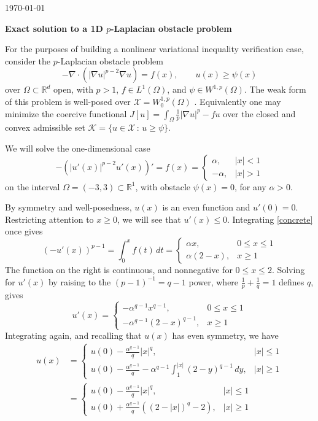 \documentclass[11pt]{amsart}
\newcommand{\Div}{\ensuremath{\nabla\cdot}}
\newcommand{\grad}{\nabla}
\newcommand{\RR}{\mathbb{R}}
\begin{document}
\scriptsize \hfill \today

\Large
\bigskip
\centerline{\textbf{Exact solution to a 1D $p$-Laplacian obstacle problem}}
\bigskip

\normalsize

\thispagestyle{empty}

For the purposes of building a nonlinear variational inequality verification case, consider the $p$-Laplacian obstacle problem
    $$-\Div(|\grad u|^{p-2} \grad u) = f(x), \qquad u(x) \ge \psi(x)$$
over $\Omega\subset \RR^d$ open, with $p>1$, $f \in L^1(\Omega)$, and $\psi \in W^{1,p}(\Omega)$.  The weak form of this problem is well-posed over $\mathcal{X} = W_0^{1,p}(\Omega)$ \cite{KinderlehrerStampacchia1980}.  Equivalently one may minimize the coercive functional $J[u] = \int_\Omega \frac{1}{p} |\grad u|^p - f u$ over the closed and convex admissible set $\mathcal{K}=\{u \in \mathcal{X}\,:\, u \ge \psi\}$.

We will solve the one-dimensional case
\begin{equation}
-\left(|u'(x)|^{p-2} u'(x)\right)' = f(x) = \begin{cases} \alpha, & |x| < 1 \\ -\alpha, & |x| > 1\end{cases} \label{concrete}
\end{equation}
on the interval $\Omega = (-3,3) \subset \RR^1$, with obstacle $\psi(x)=0$, for any $\alpha>0$.

By symmetry and well-posedness, $u(x)$ is an even function and $u'(0)=0$.  Restricting attention to $x\ge 0$, we will see that $u'(x)\le 0$.  Integrating \eqref{concrete} once gives
    $$\left(-u'(x)\right)^{p-1} = \int_0^x f(t)\,dt = \begin{cases} \alpha x, & 0 \le x \le 1 \\ \alpha (2 - x), & x \ge 1\end{cases}$$
The function on the right is continuous, and nonnegative for $0 \le x \le 2$.  Solving for $u'(x)$ by raising to the $(p-1)^{-1} = q-1$ power, where $\frac{1}{p} + \frac{1}{q} = 1$ defines $q$, gives
    $$u'(x) = \begin{cases} - \alpha^{q-1} x^{q-1}, & 0 \le x \le 1 \\ -\alpha^{q-1} (2 - x)^{q-1}, & x \ge 1\end{cases}$$
Integrating again, and recalling that $u(x)$ has even symmetry, we have
\begin{align*}
u(x) &= \begin{cases} u(0) - \frac{\alpha^{q-1}}{q} |x|^q, & |x| \le 1 \\
                      u(0) - \frac{\alpha^{q-1}}{q} -\alpha^{q-1} \int_1^{|x|} (2 - y)^{q-1}\,dy, & |x| \ge 1\end{cases} \\
     &= \begin{cases} u(0) - \frac{\alpha^{q-1}}{q} |x|^q, & |x| \le 1 \\
                      u(0) + \frac{\alpha^{q-1}}{q} \left( (2 - |x|)^q - 2 \right), & |x| \ge 1\end{cases}
\end{align*}
\end{document}
